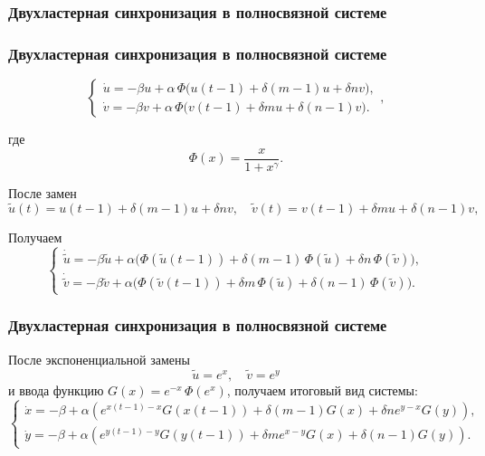\begin{frame}
	\frametitle{Двухластерная синхронизация в полносвязной системе}
	
\end{frame}

\begin{frame}
	\frametitle{Двухластерная синхронизация в полносвязной системе}
	
	\begin{equation}
		\label{eq:mg_cluster_system_norm}
		\begin{cases}
			\dot{u} = -\beta u + \alpha \, \Phi \big(u(t - 1) + \delta (m - 1) u + \delta n v\big),\\
			\dot{v} = -\beta v + \alpha  \, \Phi \big(v(t - 1) + \delta m u + \delta (n - 1) v\big).
		\end{cases},
	\end{equation}
	
	где 
	\begin{equation*}
		\Phi(x) = \dfrac{x}{1 + x^\gamma}.
	\end{equation*}
	
	После замен
	\begin{equation}
		\label{eq:tilde_change}
		\tilde{u}(t) = u(t - 1) + \delta (m - 1) u + \delta n v, \quad \tilde{v}(t) = v(t - 1) + \delta m u + \delta (n - 1) v,
	\end{equation}
	
	Получаем
	\begin{equation}
		\label{eq:mg_cluster_system_tilde}
		\begin{cases}
			\dot{\tilde{u}} = -\beta \tilde{u} + \alpha \big(\Phi(\tilde{u}(t - 1)) + \delta (m - 1) \, \Phi(\tilde{u}) + \delta n \, \Phi(\tilde{v})\big),\\
			\dot{\tilde{v}} = -\beta \tilde{v} + \alpha \big(\Phi(\tilde{v}(t - 1)) + \delta m \, \Phi(\tilde{u}) + \delta (n - 1) \, \Phi(\tilde{v})\big).
		\end{cases}
	\end{equation}
\end{frame}

\begin{frame}
	\frametitle{Двухластерная синхронизация в полносвязной системе}
	
	После экспоненциальной замены
	\begin{equation}
		\label{eq:exp_change}
		\tilde{u} = e^x, \quad \tilde{v} = e^y
	\end{equation}
	и ввода функцию $G(x) = e^{-x} \, \Phi (e^x)$, получаем итоговый вид системы:
	\begin{equation}
		\label{eq:system_main}
		\begin{cases}
			\dot{x} = -\beta + \alpha \left(e^{x(t - 1) - x} G(x(t - 1)) + \delta (m - 1) G(x) + \delta n e^{y - x} G(y)\right),\\
			\dot{y} = -\beta + \alpha \left(e^{y(t - 1) - y} G(y(t - 1)) + \delta m e^{x - y} G(x) + \delta (n - 1) G(y)\right).
		\end{cases}
	\end{equation}
\end{frame}

